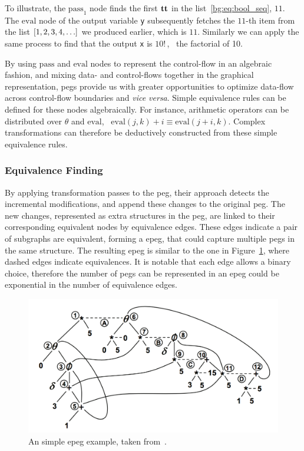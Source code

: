 To illustrate, the $\mathrm{pass}_1$ node finds the first $\mathbf{tt}$ in the
list~\eqref{bg:eq:bool_seq}, $11$.  The $\mathrm{eval}$ node of the output
variable \verb|y| subsequently fetches the $11$-th item from the list $[1, 2,
3, 4, \mathellipsis]$ we produced earlier, which is $11$.  Similarly we can
apply the same process to find that the output \verb|x| is $10!\,$, \ie~the
factorial of 10.

By using $\mathrm{pass}$ and $\mathrm{eval}$ nodes to represent the
control-flow in an algebraic fashion, and mixing data- and control-flows
together in the graphical representation, \glspl{peg} provide us with
greater opportunities to optimize data-flow across control-flow boundaries
and \emph{vice versa}.  Simple equivalence rules can be defined for these
nodes algebraically.  For instance, arithmetic operators can be distributed
over $\theta$ and $\mathrm{eval}$, \eg~$\mathrm{eval}(j, k) + i \equiv
\mathrm{eval}(j + i, k)$.  Complex transformations can therefore be deductively
constructed from these simple equivalence rules.

\subsubsection{Equivalence Finding}

By applying transformation passes to the \gls{peg}, their approach detects
the incremental modifications, and append these changes to the original
\gls{peg}\@.  The new changes, represented as extra structures in the
\gls{peg}, are linked to their corresponding equivalent nodes by equivalence
edges.  These edges indicate a pair of subgraphs are equivalent, forming a
\gls{epeg}, that could capture multiple \glspl{peg} in the same structure.  The
resulting \gls{epeg} is similar to the one in Figure~\ref{bg:fig:epeg}, where
dashed edges indicate equivalences.  It is notable that each edge allows a
binary choice, therefore the number of \glspl{peg} can be represented in an
\gls{epeg} could be exponential in the number of equivalence edges.
\begin{figure}[ht]
    \centering
    \includegraphics[width=0.8\linewidth]{bg/fig/epeg.png}
    \caption{An simple \gls{epeg} example, taken from~\cite{tate09}.
    }\label{bg:fig:epeg}
\end{figure}

